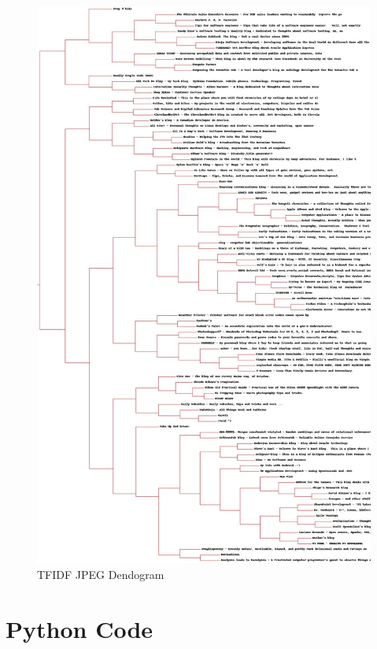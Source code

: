 \documentclass[paper=a4, fontsize=11pt]{scrartcl} %
\numberwithin{equation}{section} %
\numberwithin{figure}{section} %
\numberwithin{table}{section} %
\begin{document}
\begin{figure}[H]
\includegraphics[width=1\textwidth]{output/tfidfclust}
\caption{TFIDF JPEG Dendogram}
\label{fig:tfidf}
\end{figure}

\newpage
\section{Python Code}
\label{sec:rec-code}



\newpage 


{}

\end{document}
